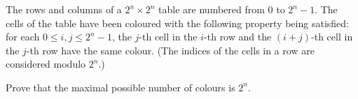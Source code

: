 The rows and columns of a $2^n \times 2^n$ table are numbered from $0$ to $2^n - 1$. The cells of the table have been coloured with the following property being satisfied: for each $0 \leq i, j \leq 2^n - 1$, the $j$-th cell in the $i$-th row and the $(i + j)$-th cell in the $j$-th row have the same colour. (The indices of the cells in a row are considered modulo $2^n$.)

Prove that the maximal possible number of colours is $2^n$.

